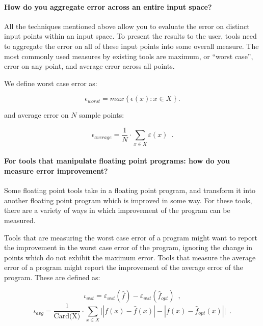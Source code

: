 \documentclass[main.tex]{subfiles}
\begin{document}
\paragraph{How do you aggregate error across an entire input space?}

All the techniques mentioned above allow you to evaluate the error on
distinct input points within an input space. To present the results to
the user, tools need to aggregate the error on all of these input
points into some overall measure. The most commonly used measures by
existing tools are maximum, or ``worst case'', error on any point, and
average error across all points.

We define worst case error as:

\begin{equation}
  \epsilon_{worst} = max \left\{\epsilon(x) : x \in X\right\} .
\end{equation}

and average error on $N$ sample points:

\begin{equation}
  \epsilon_{average} = \frac{1}{N} \cdot \sum_{x\in X} \varepsilon(x) \enspace .
\end{equation}

\paragraph{For tools that manipulate floating point programs: how do you
  measure error improvement?}

Some floating point tools take in a floating point program, and
transform it into another floating point program which is improved in
some way. For these tools, there are a variety of ways in which
improvement of the program can be measured.

Tools that are measuring the worst case error of a program might want
to report the improvement in the worst case error of the program,
ignoring the change in points which do not exhibit the maximum
error. Tools that measure the average error of a program might report
the improvement of the average error of the program. These are defined
as:

\begin{equation}
\iota_{wst} = \varepsilon_{wst}(\hat{f}) - \varepsilon_{wst}(\hat{f}_{opt})\enspace,
\end{equation}
 \begin{equation}
\iota_{avg} = \frac{1}{\text{Card(X)}} \cdot \sum_{x\in X}  \big| |f(x)-\hat{f}(x)| - |f(x)-\hat{f}_{opt}(x)|  \big|\enspace .
\end{equation}
\end{document}

